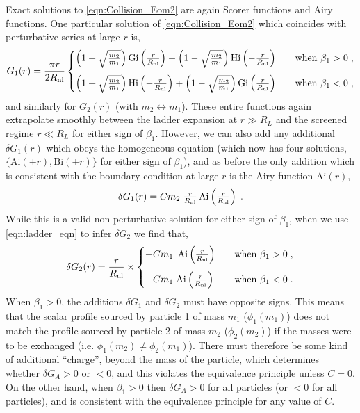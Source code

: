 \documentclass[11pt]{article}
\begin{document}
Exact solutions to \eqref{eqn:Collision_Eom2} are again Scorer functions and Airy functions. One particular solution of \eqref{eqn:Collision_Eom2} which coincides with perturbative series at large $r$ is,  
\begin{align}
 G_1 (r)  =  \frac{\pi r}{2 R_{\rm nl}} \begin{cases}
  \left( 1 + \sqrt{\frac{m_2}{m_1}} \right) \text{Gi} \left(  \frac{r}{R_{\rm nl} }   \right) + \left( 1 - \sqrt{\frac{m_2}{m_1}} \right) \text{Hi} \left( - \frac{r}{R_{\rm nl} }   \right)  \quad &\text{when } \beta_1 > 0 \; ,  \\[10pt]
   \left( 1 + \sqrt{\frac{m_2}{m_1}} \right)   \text{Hi} \left( - \frac{r}{R_{\rm nl}}   \right) +  \left( 1 - \sqrt{\frac{m_2}{m_1}} \right)  \text{Gi} \left(  \frac{r}{R_{\rm nl}}   \right) \quad &\text{when } \beta_1 < 0 \; ,
   \end{cases}
\end{align}
and similarly for $G_2(r)$ (with $m_2 \leftrightarrow m_1$). 
These entire functions again extrapolate smoothly between the ladder expansion at $r \gg R_L$ and the screened regime $r \ll R_L$ for either sign of $\beta_1$. 
However, we can also add any additional $\delta G_1 (r)$ which obeys the homogeneous equation (which now has four solutions, $\{  \text{Ai} ( \pm r) , \text{Bi} (\pm r) \}$ for either sign of $\beta_1$), and as before the only addition which is consistent with the boundary condition at large $r$ is the Airy function $\text{Ai} (r)$,
\begin{align}
\delta G_1 (r) = C m_2  \; \tfrac{ r }{ R_{\rm nl} } \,  \text{Ai} \left( \tfrac{r}{R_{\rm nl}}  \right) \; .
\end{align}
While this is a valid non-perturbative solution for either sign of $\beta_1$, when we use \eqref{eqn:ladder_eqn} to infer $\delta G_2$ we find that,
\begin{align}
 \delta G_2 (r)  =  \frac{r}{R_{\rm nl}} \times  \begin{cases}
  + C m_1  \;  \,  \text{Ai} \left( \frac{r}{R_{\rm nl}}  \right)   \quad &\text{when } \beta_1 > 0 \; ,  \\[10pt]
  - C m_1 \; \text{Ai} \left( \frac{r}{R_{\rm nl}}  \right)  \quad &\text{when } \beta_1 < 0 \; . 
   \end{cases}
\end{align}
When $\beta_1 > 0$, the additions $\delta G_1$ and $\delta G_2$ must have opposite signs. This means that the scalar profile sourced by particle 1 of mass $m_1$ ($\phi_1 (m_1)$) does not match the profile sourced by particle 2 of mass $m_2$ ($\phi_2 (m_2)$) if the masses were to be exchanged (i.e. $\phi_1 (m_2)  \neq \phi_2 (m_1) $). There must therefore be some kind of additional ``charge'', beyond the mass of the particle, which determines whether $\delta G_A > 0$ or $<0$, and this violates the equivalence principle unless $C=0$. 
On the other hand, when $\beta_ 1 >0$ then $\delta G_A > 0$ for all particles (or $<0$ for all particles), and is consistent with the equivalence principle for any value of $C$.  
\end{document}
